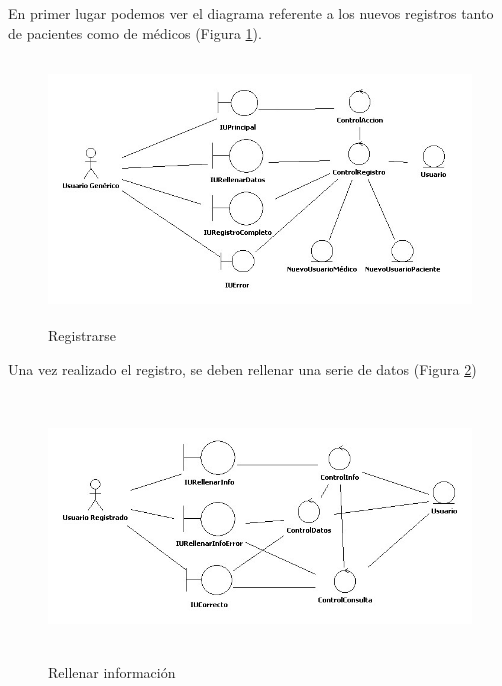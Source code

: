 \documentclass[a4paper,oneside,11pt]{book}
\begin{document}
		En primer lugar podemos ver el diagrama referente a los nuevos registros tanto de pacientes como de médicos (Figura \ref{fig:col_clase7}).
		\begin{figure}[H]
		  \centering
		    \includegraphics[width=15cm, height= 7cm]{img/jpg/clases/7_Registrarse.jpg}
		  \caption{Registrarse}
		  \label{fig:col_clase7}
		\end{figure}

		Una vez realizado el registro, se deben rellenar una serie de datos (Figura \ref{fig:col_clase8})
		\begin{figure}[H]
		  \centering
		    \includegraphics[width=15cm, height=7cm]{img/jpg/clases/7_RellenarInfo.jpg}
		  \caption{Rellenar información}
		  \label{fig:col_clase8}
		\end{figure}
		
\end{document}
